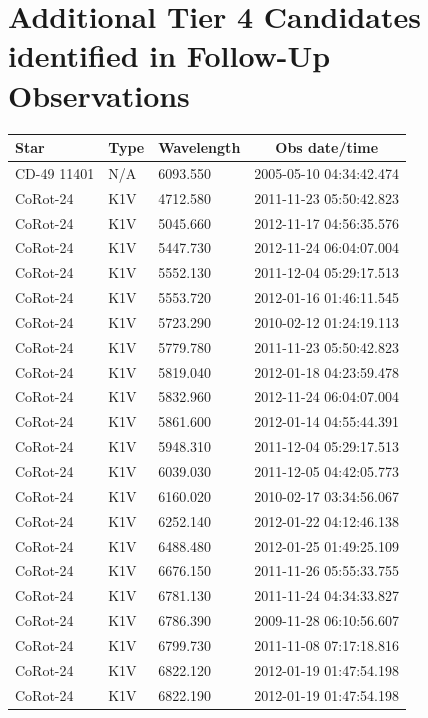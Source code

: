 \documentclass[twocolumn]{aastex701}
\begin{document}
\onecolumngrid
\clearpage

\section{Additional Tier 4 Candidates identified in Follow-Up Observations}
\label{s:repeat_candidates}

\begin{longtable}{|l|l|l|c|}
\hline
Star & Type & Wavelength & Obs date/time \\
\hline
CD-49 11401 & N/A & 6093.550 & 2005-05-10 04:34:42.474 \\
CoRot-24 & K1V & 4712.580 & 2011-11-23 05:50:42.823 \\
CoRot-24 & K1V & 5045.660 & 2012-11-17 04:56:35.576 \\
CoRot-24 & K1V & 5447.730 & 2012-11-24 06:04:07.004 \\
CoRot-24 & K1V & 5552.130 & 2011-12-04 05:29:17.513 \\
CoRot-24 & K1V & 5553.720 & 2012-01-16 01:46:11.545 \\
CoRot-24 & K1V & 5723.290 & 2010-02-12 01:24:19.113 \\
CoRot-24 & K1V & 5779.780 & 2011-11-23 05:50:42.823 \\
CoRot-24 & K1V & 5819.040 & 2012-01-18 04:23:59.478 \\
CoRot-24 & K1V & 5832.960 & 2012-11-24 06:04:07.004 \\
CoRot-24 & K1V  & 5861.600 & 2012-01-14 04:55:44.391 \\
CoRot-24 & K1V & 5948.310 & 2011-12-04 05:29:17.513 \\
CoRot-24 & K1V  & 6039.030 & 2011-12-05 04:42:05.773 \\
CoRot-24 & K1V & 6160.020 & 2010-02-17 03:34:56.067 \\
CoRot-24 & K1V & 6252.140 & 2012-01-22 04:12:46.138 \\
CoRot-24 & K1V & 6488.480 & 2012-01-25 01:49:25.109 \\
CoRot-24 & K1V & 6676.150 & 2011-11-26 05:55:33.755 \\
CoRot-24 & K1V & 6781.130 & 2011-11-24 04:34:33.827 \\
CoRot-24 & K1V & 6786.390 & 2009-11-28 06:10:56.607 \\
CoRot-24 & K1V & 6799.730 & 2011-11-08 07:17:18.816 \\
CoRot-24 & K1V & 6822.120 & 2012-01-19 01:47:54.198 \\
CoRot-24 & K1V & 6822.190 & 2012-01-19 01:47:54.198 \\

\end{longtable}
\end{document}
